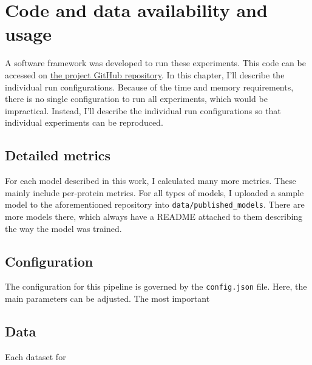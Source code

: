 \chapter{Code and data availability and usage}

A software framework was developed to run these experiments. This code can be accessed on \href{https://github.com/eleniel-mocna/Refined}{the project GitHub repository}. In this chapter, I'll describe the individual run configurations. Because of the time and memory requirements, there is no single configuration to run all experiments, which would be impractical. Instead, I'll describe the individual run configurations so that individual experiments can be reproduced.

\section{Detailed metrics}
\label{metrics_availability}

For each model described in this work, I calculated many more metrics. These mainly include per-protein metrics. For all types of models, I uploaded a sample model to the aforementioned repository into \texttt{data/published\_models}. There are more models there, which always have a README attached to them describing the way the model was trained.

\section{Configuration}

The configuration for this pipeline is governed by the \texttt{config.json} file. Here, the main parameters can be adjusted. The most important

\section{Data}

Each dataset for 
